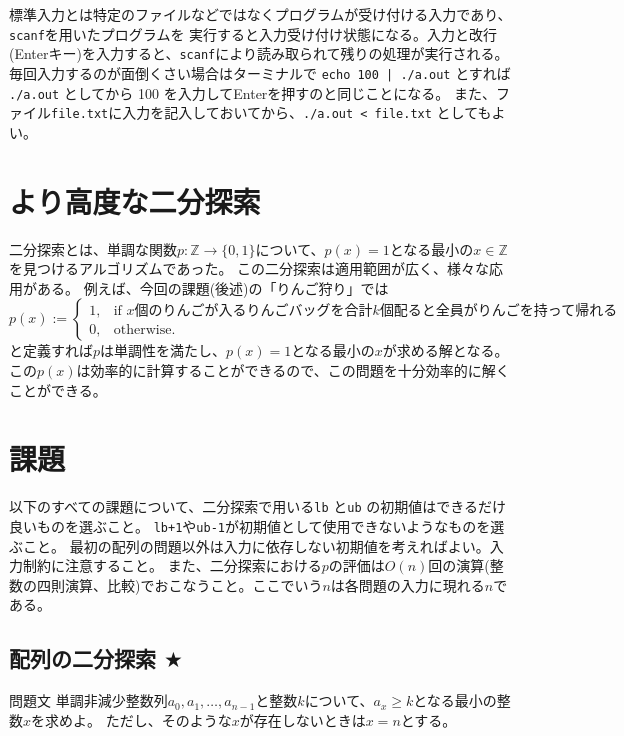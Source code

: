 \documentclass[a4paper,twoside,onecolumn,openany,article,10pt]{memoir}
\theoremstyle{remark}
\begin{document}
標準入力とは特定のファイルなどではなくプログラムが受け付ける入力であり、\texttt{scanf}を用いたプログラムを
実行すると入力受け付け状態になる。入力と改行(Enterキー)を入力すると、\texttt{scanf}により読み取られて残りの処理が実行される。
毎回入力するのが面倒くさい場合はターミナルで \texttt{echo 100 | ./a.out} とすれば \texttt{./a.out} としてから 100 を入力してEnterを押すのと同じことになる。
また、ファイル\texttt{file.txt}に入力を記入しておいてから、\texttt{./a.out < file.txt} としてもよい。

\section{より高度な二分探索}
二分探索とは、単調な関数$p\colon \mathbb{Z}\to\{0,1\}$について、$p(x)=1$となる最小の$x\in\mathbb{Z}$を見つけるアルゴリズムであった。
この二分探索は適用範囲が広く、様々な応用がある。
例えば、今回の課題(後述)の「りんご狩り」では
\begin{equation*}
p(x) := \begin{cases}
1,& \text{if $x$個のりんごが入るりんごバッグを合計$k$個配ると全員がりんごを持って帰れる}\\
0,& \text{otherwise.}
\end{cases}
\end{equation*}
と定義すれば$p$は単調性を満たし、$p(x)=1$となる最小の$x$が求める解となる。
この$p(x)$は効率的に計算することができるので、この問題を十分効率的に解くことができる。



\section{課題}\label{sec:assign}
以下のすべての課題について、二分探索で用いる\texttt{lb} と\texttt{ub} の初期値はできるだけ良いものを選ぶこと。
\texttt{lb+1}や\texttt{ub-1}が初期値として使用できないようなものを選ぶこと。
最初の配列の問題以外は入力に依存しない初期値を考えればよい。入力制約に注意すること。
また、二分探索における$p$の評価は$O(n)$回の演算(整数の四則演算、比較)でおこなうこと。ここでいう$n$は各問題の入力に現れる$n$である。

\clearpage
\subsection{配列の二分探索 $\bigstar$}
\begin{itembox}[l]{問題文}
単調非減少整数列$a_0, a_1,\dotsc, a_{n-1}$と整数$k$について、$a_x\ge k$となる最小の整数$x$を求めよ。
ただし、そのような$x$が存在しないときは$x=n$とする。
\end{itembox}
\end{document}
